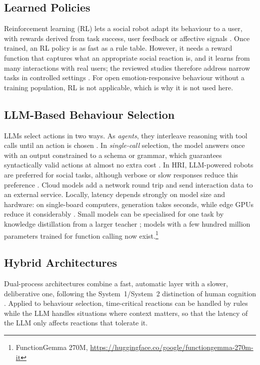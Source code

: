 \documentclass[conference]{IEEEtran}
\begin{document}
\subsection{Learned Policies}
Reinforcement learning (RL) lets a social robot adapt its behaviour to a
user, with rewards derived from task success, user feedback or affective
signals \cite{Akalin2021RL}. Once trained, an RL policy is as fast as a rule
table. However, it needs a reward function that captures what an appropriate
social reaction is, and it learns from many interactions with real users;
the reviewed studies therefore address narrow tasks in controlled settings
\cite{Akalin2021RL}. For open emotion-responsive behaviour without a training
population, RL is not applicable, which is why it is not used here.

\subsection{LLM-Based Behaviour Selection}
LLMs select actions in two ways. As \emph{agents}, they interleave reasoning
with tool calls until an action is chosen \cite{Yao2023ReAct}. In
\emph{single-call} selection, the model
answers once with an output constrained to a schema or grammar, which
guarantees syntactically valid actions at almost no extra cost
\cite{Willard2023Guided}. In HRI, LLM-powered robots are preferred for
social tasks, although verbose or slow responses reduce this preference
\cite{Kim2024LLMHRI}. Cloud models add a network round trip and send
interaction data to an external service. Locally, latency depends strongly on model size and
hardware: on single-board computers, generation takes seconds, while edge
GPUs reduce it considerably \cite{Abstreiter2025Edge}. Small models can be
specialised for one task by knowledge distillation from a larger teacher
\cite{Hinton2015Distill}; models with a few hundred million parameters
trained for function calling now exist.\footnote{FunctionGemma 270M,
\url{https://huggingface.co/google/functiongemma-270m-it}}

\subsection{Hybrid Architectures}
Dual-process architectures combine a fast, automatic layer with a slower,
deliberative one, following the System~1/System~2 distinction of human
cognition \cite{Umbrico2022Miriam}. Applied to behaviour selection,
time-critical reactions can be handled by rules while the LLM handles
situations where context matters, so that the latency of the LLM only
affects reactions that tolerate it.
\end{document}
